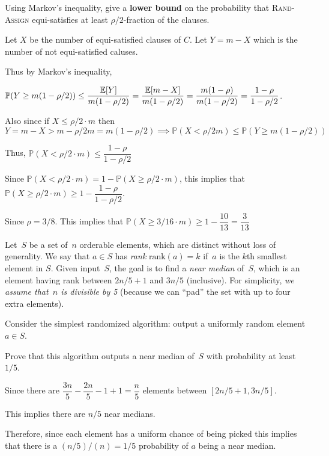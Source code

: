 \documentclass[12pt, letterpaper]{article}
\renewcommand{\P}{\mathbb{P}}
\renewcommand{\t}[1]{\text{#1}}
\begin{document}
\begin{subproblem}{}
  Using Markov's inequality, give a \textbf{lower bound} on the probability that \textsc{Rand-Assign} equi-satisfies at least $\rho/2$-fraction of the clauses.
\end{subproblem}
\begin{problemproof}
  Let $X$ be the number of equi-satisfied clauses of $C$. Let $Y=m-X$ which is the number of not equi-satisfied caluses.

  Thus by Markov's inequality, 
  
  $\P(Y \geq m(1-\rho/2)) \leq \dfrac{\E[Y]}{m(1-\rho/2)} = \dfrac{\E[m-X]}{m(1-\rho/2)}=\dfrac{m(1-\rho)}{m(1-\rho/2)}=\dfrac{1-\rho}{1-\rho/2}$.

  Also since if $X \leq \rho/2 \cdot m$ then
  \[Y=m-X > m-\rho/2 m = m(1-\rho/2) \implies \P(X < \rho/2 m) \leq \P(Y \geq m(1-\rho/2))\]

  Thus, $\P(X < \rho/2 \cdot m) \leq \dfrac{1-\rho}{1-\rho/2}$

  Since $\P(X < \rho/2\cdot m)=1-\P(X \geq \rho/2 \cdot m)$, this implies that $\P(X \geq \rho/2 \cdot m) \geq 1-\dfrac{1-\rho}{1-\rho/2}$.

  Since $\rho=3/8$. This implies that $\P(X \geq 3/16 \cdot m) \geq 1-\dfrac{10}{13}=\dfrac{3}{13}$
\end{problemproof}

\begin{problem}{}
  Let~$S$ be a set of~$n$ orderable elements, which are distinct without loss of generality.
  We say that $a\in S$ has \emph{rank} $\t{rank}(a)=k$ if~$a$ is the $k$th smallest element in $S$.
  Given input~$S$, the goal is to find a \emph{near median} of~$S$, which is an element having rank between $2n/5+1$ and $3n/5$ (inclusive).
  For simplicity, \emph{we assume that~$n$ is divisible by 5} (because we can ``pad'' the set with up to four extra elements).
\end{problem}

\begin{subproblem}{}
  Consider the simplest randomized algorithm: output a uniformly random element $a \in S$.
    
    Prove that this algorithm outputs a near median of~$S$ with probability at least $1/5$.
\end{subproblem}
\begin{problemproof}
  Since there are $\dfrac{3n}{5}-\dfrac{2n}{5}-1+1=\dfrac{n}{5}$ elements between $[2n/5+1,3n/5]$.

  This implies there are $n/5$ near medians.

  Therefore, since each element has a uniform chance of being picked this implies that there is a $(n/5)/(n)=1/5$ probability of $a$ being a near median.
\end{problemproof}
\end{document}
